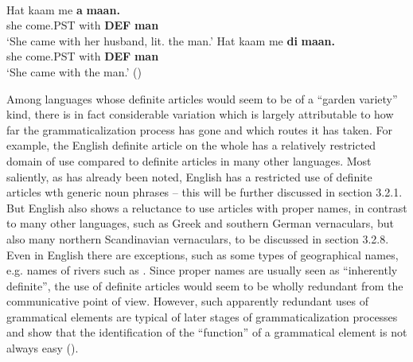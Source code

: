 
\ea\label{}
\\
\ea 
	\gll 	Hat  kaam  me  \textbf{a} \textbf{maan.}\\
			she  come.PST  with  \textbf{DEF} \textbf{man}\\
	\glt 	‘She came with her husband, lit. the man.’
\ex
	\gll	Hat  kaam  me  \textbf{di} \textbf{  maan.}\\
			she  come.PST  with  \textbf{DEF} \textbf{man}\\
	\glt	‘She came with the man.’ (\citet[163]{Lyons1999})

	\z 
\z

Among languages whose definite articles would seem to be of a “garden variety” kind, there is in fact considerable variation which is largely attributable to how far the grammaticalization process has gone and which routes it has taken. For example, the English definite article on the whole has a relatively restricted domain of use compared to definite articles in many other languages. Most saliently, as has already been noted, English has a restricted use of definite articles wth generic noun phrases – this will be further discussed in section 3.2.1. But English also shows a reluctance to use articles with proper names, in contrast to many other languages, such as Greek and southern German vernaculars, but also many northern Scandinavian vernaculars, to be discussed in section 3.2.8. Even in English there are exceptions, such as some types of geographical names, e.g. names of rivers such as . Since proper names are usually seen as “inherently definite”, the use of definite articles would seem to be wholly redundant from the communicative point of view. However, such apparently redundant uses of grammatical elements are typical of later stages of grammaticalization processes and show that the identification of the “function” of a grammatical element is not always easy (\citet[81-86]{Dahl2004}).


